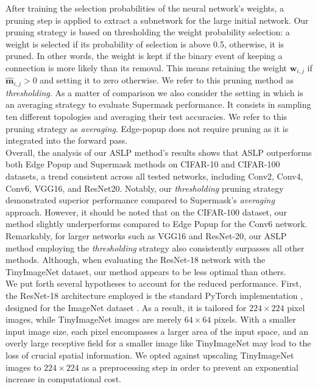 After training the selection probabilities of the neural network's weights, a
pruning step is applied to extract a subnetwork for the large initial network.
Our pruning strategy is based on thresholding the weight probability selection:
a weight is selected if its probability of selection is above 0.5, otherwise, it
is pruned. In other words, the weight is kept if the binary event of keeping a
connection is more likely than its removal. This means retaining the weight
$\bm{w}_{i,j}$ if $\bm{\hat{m}}_{i,j} > 0$ and setting it to zero otherwise. We
refer to this pruning method as \textit{thresholding}. As a matter of comparison
we also consider the setting in \citeauthor{DBLP:conf/nips/ZhouLLY19} which is
an averaging strategy to evaluate Supermask performance. It consists in sampling
ten different topologies and averaging their test accuracies. We refer to this
pruning strategy as \textit{averaging}. Edge-popup does not require pruning as it
is integrated into the forward pass. \\

Overall, the analysis of our ASLP method's results shows that ASLP outperforms
both Edge Popup and Supermask methods on CIFAR-10 and CIFAR-100 datasets, a
trend consistent across all tested networks, including Conv2, Conv4, Conv6,
VGG16, and ResNet20. Notably, our \textit{thresholding} pruning strategy
demonstrated superior performance compared to Supermask's \textit{averaging}
approach. However, it should be noted that on the CIFAR-100 dataset, our method
slightly underperforms compared to Edge Popup for the Conv6 network.\\

Remarkably, for larger networks such as VGG16 and ResNet-20, our ASLP method
employing the \textit{thresholding} strategy also consistently surpasses all
other methods. Although, when evaluating the ResNet-18 network with the
TinyImageNet dataset, our method appears to be less optimal than others. \\


We put forth several hypotheses to account for the reduced performance. First,
the ResNet-18 architecture employed is the standard PyTorch implementation
\cite{pytorch_resnet18}, designed for the ImageNet dataset
\cite{deng2009imagenet}. As a result, it is tailored for $224 \times 224$ pixel
images, while TinyImageNet images are merely $64 \times 64$ pixels. With a
smaller input image size, each pixel encompasses a larger area of the input
space, and an overly large receptive field for a smaller image like TinyImageNet
may lead to the loss of crucial spatial information. We opted against upscaling
TinyImageNet images to $224 \times 224$ as a preprocessing step in order to
prevent an exponential increase in computational cost.\\

